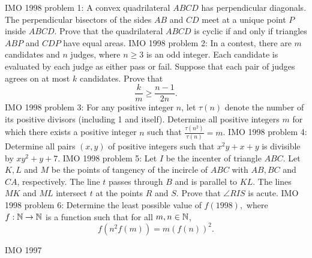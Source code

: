 IMO 1998 problem 1:  A convex quadrilateral $ABCD$ has perpendicular diagonals. The perpendicular bisectors of the sides $AB$ and $CD$ meet at a unique point $P$ inside $ABCD$. Prove that the quadrilateral $ABCD$ is cyclic if and only if triangles $ABP$ and $CDP$ have equal areas. 
IMO 1998 problem 2:  In a contest, there are $m$ candidates and $n$ judges, where $n\geq 3$ is an odd integer. Each candidate is evaluated by each judge as either pass or fail. Suppose that each pair of judges agrees on at most $k$ candidates. Prove that
\[ {\frac{k}{m}} \geq {\frac{n-1}{2n}}. \] 
IMO 1998 problem 3:  For any positive integer $n$, let $\tau (n)$ denote the number of its positive divisors (including 1 and itself). Determine all positive integers $m$ for which there exists a positive integer $n$ such that $\frac{\tau (n^2)}{\tau (n)}=m$. 
IMO 1998 problem 4:  Determine all pairs $(x,y)$ of positive integers such that $x^2y+x+y$ is divisible by $xy^2+y+7$. 
IMO 1998 problem 5:  Let $I$ be the incenter of triangle $ABC$. Let $K,L$ and $M$ be the points of tangency of the incircle of $ABC$ with $AB,BC$ and $CA$, respectively. The line $t$ passes through $B$ and is parallel to $KL$. The lines $MK$ and $ML$ intersect $t$ at the points $R$ and $S$. Prove that $\angle RIS$ is acute. 
IMO 1998 problem 6:  Determine the least possible value of $f(1998),$ where $f:\Bbb{N}\to \Bbb{N}$ is a function such that for all $m,n\in {\Bbb N}$,
\[ f\left( n^2f(m)\right) =m\left( f(n)\right) ^2. \] 


IMO 1997 

